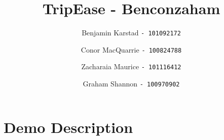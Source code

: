 \documentclass[12pt]{article}
\title{TripEase - Benconzaham}
\author{
Benjamin Karstad
\texttt{- 101092172}
\and
Conor MacQuarrie
\texttt{- 100824788}
\and
Zacharaia Maurice
\texttt{- 101116412}
\and
Graham Shannon
\texttt{- 100970902}
}
\begin{document}
	\maketitle

	\section*{Demo Description}
        
	
\end{document}
